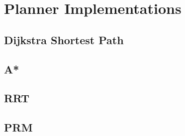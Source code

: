 \section{Planner Implementations}

\subsection{Dijkstra Shortest Path}


\subsection{A*}


\subsection{RRT}


\subsection{PRM}
